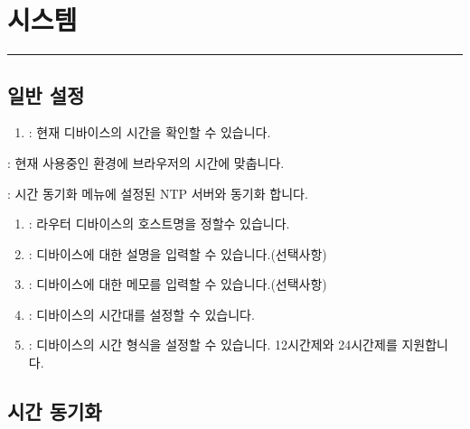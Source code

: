 \documentclass[letterpaper,10pt,english]{sphinxmanual}
\begin{document}
\sphinxstepscope


\section{시스템}
\label{\detokenize{main_menu/system:id1}}\label{\detokenize{main_menu/system::doc}}

\bigskip\hrule\bigskip



\subsection{일반 설정}
\label{\detokenize{main_menu/system:id2}}
\noindent{}
\begin{enumerate}
%
\item {} 
\sphinxAtStartPar
{} : 현재 디바이스의 시간을 확인할 수 있습니다.

\end{enumerate}

\sphinxAtStartPar
{}: 현재 사용중인 환경에 브라우저의 시간에 맞춥니다.

\sphinxAtStartPar
{} : 시간 동기화 메뉴에 설정된 NTP 서버와 동기화 합니다.
\begin{enumerate}
%
\setcounter{enumi}{1}
\item {} 
\sphinxAtStartPar
{}: 라우터 디바이스의 호스트명을 정할수 있습니다.

\item {} 
\sphinxAtStartPar
{}: 디바이스에 대한 설명을 입력할 수 있습니다.(선택사항)

\item {} 
\sphinxAtStartPar
{}: 디바이스에 대한 메모를 입력할 수 있습니다.(선택사항)

\item {} 
\sphinxAtStartPar
{}: 디바이스의 시간대를 설정할 수 있습니다.

\item {} 
\sphinxAtStartPar
{}: 디바이스의 시간 형식을 설정할 수 있습니다. 12시간제와 24시간제를 지원합니다.

\end{enumerate}


\subsection{시간 동기화}
\label{\detokenize{main_menu/system:id3}}
\noindent{}
\end{document}
